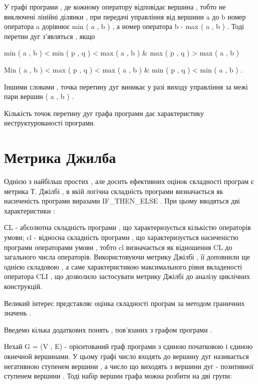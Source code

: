 У графі програми , де кожному оператору відповідає вершина , тобто не виключені лінійні ділянки , при передачі управління від вершини a до b номер оператора a дорівнює min ( a , b ) , а номер оператора b - max ( a , b ) . Тоді перетин дуг з'являться , якщо

min ( a , b ) \textless{} min ( p , q ) \textless{} max ( a , b ) \& max ( p , q ) \textgreater{} max ( a , b ) \textbar{}

\begin{list}{0em}
\item[] Min ( a , b ) \textless{} max ( p , q ) \textless{} max ( a , b ) \& min ( p , q ) \textless{} min ( a , b ) .
\end{list}

Іншими словами , точка перетину дуг виникає у разі виходу управління за межі пари вершин ( a , b ) .

Кількість точок перетину дуг графа програми дає характеристику неструктурованості програми.


\section{Метрика Джилба}
\label{2section:id12}
Однією з найбільш простих , але досить ефективних оцінок складності програм є метрика Т. Джілбі , в якій логічна складність програми визначається як насиченість програми виразами IF\_THEN\_ELSE . При цьому вводяться дві характеристики :

СL - абсолютна складність програми , що характеризується кількістю операторів умови;
cl - відносна складність програми , що характеризується насиченістю програми операторами умови , тобто cl визначається як відношення CL до загального числа операторів.
Використовуючи метрику Джілбі , її доповнили ще однією складовою , а саме характеристикою максимального рівня вкладеності оператора CLI , що дозволило застосувати метрику Джілбі до аналізу циклічних конструкцій.

Великий інтерес представляє оцінка складності програм за методом граничних значень .

Введемо кілька додаткових понять , пов'язаних з графом програми .

Нехай G = (V , E) - орієнтований граф програми з єдиною початковою і єдиною окнечной вершинами. У цьому графі число входять до вершину дуг називається негативною ступенем вершини , а число що виходять з вершини дуг - позитивної ступенем вершини . Тоді набір вершин графа можна розбити на дві групи:

